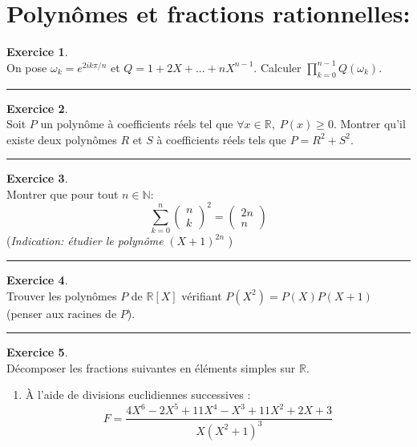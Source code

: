 \documentclass[a4paper,10pt]{article}
\theoremstyle{definition}
\theoremstyle{definition}
\newtheorem{exo}{Exercice}
\newcommand{\R}{\mathbb{R}}
\newcommand{\N}{\mathbb{N}}
\begin{document}
\section*{Polynômes et fractions rationnelles:}
\begin{minipage}{1\linewidth}
\begin{minipage}[t]{0.48\linewidth}
\raggedright



\begin{exo}\quad\\
On pose $\omega_k=e^{2ik\pi/n}$ et $Q=1+2X+...+nX^{n-1}$. Calculer $\prod_{k=0}^{n-1}Q(\omega_k)$.

\centering
\rule{1\linewidth}{0.6pt}
\end{exo}

\begin{exo}\quad\\
Soit $P$ un polynôme à coefficients réels tel que $\forall x\in\R,\;P(x)\geq 0$. Montrer qu'il existe deux polynômes $R$ et $S$ à coefficients réels tels que $P=R^2+S^2$.

\centering
\rule{1\linewidth}{0.6pt}
\end{exo}


\begin{exo}\quad\\
Montrer que pour tout $n\in\N$:
$$\sum_{k=0}^{n}\begin{pmatrix}
n\\k
\end{pmatrix}^2  =  \begin{pmatrix}
2n\\n
\end{pmatrix}$$
(\textit{Indication: étudier le polynôme } $(X+1)^{2n} $ )

\centering\rule{1\linewidth}{0.6pt}
\end{exo}

\begin{exo}\quad\\
Trouver les polynômes $P$ de $\R[X]$ vérifiant $P(X^2)=P(X)P(X+1)$ (penser aux racines de $P$).

\centering
\rule{1\linewidth}{0.6pt}
\end{exo}

\begin{exo}\quad\\
Décomposer les fractions suivantes en éléments simples sur $\R$.
\begin{enumerate}
\item \`A l'aide de divisions euclidiennes successives :
$$F=\frac{4X^6-2X^5+11X^4-X^3+11X^2+2X+3}{X(X^2+1)^3}$$
\end{enumerate}


\end{exo}
\end{minipage}
\end{minipage}
\end{document}
